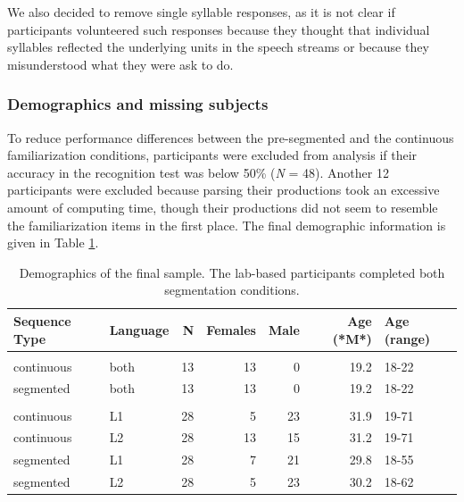 \documentclass[
]{article}
\begin{document}
We also decided to remove single syllable responses, as it is not clear
if participants volunteered such responses because they thought that
individual syllables reflected the underlying units in the speech
streams or because they misunderstood what they were ask to do.

\subsubsection{Demographics and missing
subjects}\label{demographics-and-missing-subjects}

To reduce performance differences between the pre-segmented and the
continuous familiarization conditions, participants were excluded from
analysis if their accuracy in the recognition test was below 50\%
(\emph{N} = 48). Another 12 participants were excluded because parsing
their productions took an excessive amount of computing time, though
their productions did not seem to resemble the familiarization items in
the first place. The final demographic information is given in Table
\ref{tab:recall-final-demographics-print}.

\begin{longtable}[t]{llrrrrl}
\caption{\label{tab:recall-final-demographics-print}Demographics of the final sample. The lab-based participants completed both segmentation conditions.}\\
\toprule
Sequence Type & Language & N & Females & Male & Age (*M*) & Age (range)\\
\midrule
\addlinespace[0.3em]
\multicolumn{7}{l}{\textbf{Lab-based}}\\
\hspace{1em}continuous & both & 13 & 13 & 0 & 19.2 & 18-22\\
\hspace{1em}segmented & both & 13 & 13 & 0 & 19.2 & 18-22\\
\addlinespace[0.3em]
\multicolumn{7}{l}{\textbf{Online}}\\
\hspace{1em}continuous & L1 & 28 & 5 & 23 & 31.9 & 19-71\\
\hspace{1em}continuous & L2 & 28 & 13 & 15 & 31.2 & 19-71\\
\hspace{1em}segmented & L1 & 28 & 7 & 21 & 29.8 & 18-55\\
\hspace{1em}segmented & L2 & 28 & 5 & 23 & 30.2 & 18-62\\
\bottomrule
\end{longtable}
\end{document}
